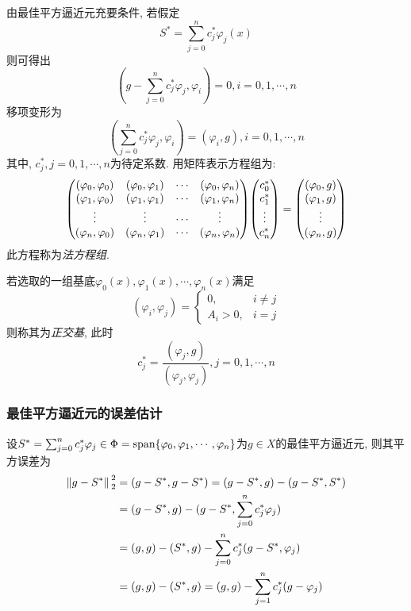 由最佳平方逼近元充要条件, 若假定
\begin{equation*}
    S^*=\sum_{j=0}^nc_j^*\varphi_j(x)
\end{equation*}
则可得出
\begin{equation*}
    \left(g-\sum_{j=0}^nc_j^*\varphi_j,\varphi_i\right)=0, i=0,1,\cdots,n
\end{equation*}
移项变形为
\begin{equation*}
    \left(\sum_{j=0}^nc_j^*\varphi_j,\varphi_i\right)=(\varphi_i,g), i=0,1,\cdots,n
\end{equation*}
其中, $c_j^*,j=0,1,\cdots,n$为待定系数. 用矩阵表示方程组为:
\begin{equation*}
    \mqty(
        (\varphi_0,\varphi_0)&(\varphi_0,\varphi_1)&\cdots&(\varphi_0,\varphi_n)\\
        (\varphi_1,\varphi_0)&(\varphi_1,\varphi_1)&\cdots&(\varphi_1,\varphi_n)\\
        \vdots&\vdots&\cdots&\vdots\\
        (\varphi_n,\varphi_0)&(\varphi_n,\varphi_1)&\cdots&(\varphi_n,\varphi_n)
    )\mqty(
        c_0^*\\c_1^*\\\vdots\\c_n^*
    )=\mqty(
        (\varphi_0,g)\\(\varphi_1,g)\\\vdots\\(\varphi_n,g)
    )
\end{equation*}
此方程称为\emph{法方程组}.

若选取的一组基底${\varphi_0(x),\varphi_1(x),\cdots,\varphi_n(x)}$满足
\begin{equation*}
    (\varphi_i,\varphi_j)=\begin{cases}
        0,&i\ne j\\
        A_i>0,&i=j
    \end{cases}
\end{equation*}
则称其为\emph{正交基}, 此时
\begin{equation*}
    c_j^*=\frac{(\varphi_j,g)}{(\varphi_j,\varphi_j)}, j=0,1,\cdots,n
\end{equation*}

\subsubsection{最佳平方逼近元的误差估计}

设$S^*=\sum_{j=0}^nc_j^*\varphi_j\in\Phi=\text{span}\{\varphi_0,\varphi_1,\cdots,\varphi_n\}$为$g\in X$的最佳平方逼近元, 则其平方误差为
\begin{align*}
    \norm*{g-S^*}_2^2&=(g-S^*,g-S^*)=(g-S^*,g)-(g-S^*,S^*)\\
    &=(g-S^*,g)-(g-S^*,\sum_{j=0}^nc_j^*\varphi_j)\\
    &=(g,g)-(S^*,g)-\sum_{j=0}^nc_j^*(g-S^*,\varphi_j)\\
    &=(g,g)-(S^*,g)=(g,g)-\sum_{j=1}^nc_j^*(g-\varphi_j)
\end{align*}

